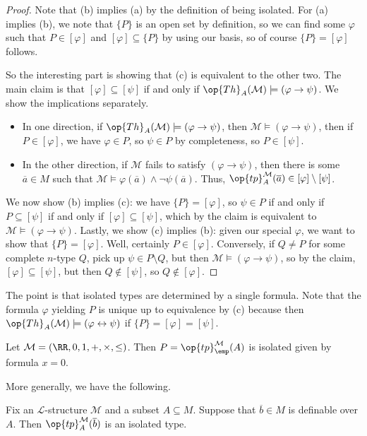 \documentclass[../notes.tex]{subfiles}
\begin{document}
\begin{proof}
	Note that (b) implies (a) by the definition of being isolated. For (a) implies (b), we note that $\{P\}$ is an open set by definition, so we can find some $\varphi$ such that $P\in[\varphi]$ and $[\varphi]\subseteq\{P\}$ by using our basis, so of course $\{P\}=[\varphi]$ follows.

	So the interesting part is showing that (c) is equivalent to the other two. The main claim is that $[\varphi]\subseteq[\psi]$ if and only if $\op{Th}_A(\mathcal M)\models(\varphi\to\psi)$. We show the implications separately.
	\begin{itemize}
		\item In one direction, if $\op{Th}_A(\mathcal M)\models(\varphi\to\psi)$, then $\mathcal M\models(\varphi\to\psi)$, then if $P\in[\varphi]$, we have $\varphi\in P$, so $\psi\in P$ by completeness, so $P\in[\psi]$.
		\item In the other direction, if $\mathcal M$ fails to satisfy $(\varphi\to\psi)$, then there is some $\overline a\in M$ such that $\mathcal M\models\varphi(\overline a)\land\lnot\psi(\overline a)$. Thus, $\op{tp}_A^{\mathcal M}(\overline a)\in[\varphi]\setminus[\psi]$.
	\end{itemize}
	We now show (b) implies (c): we have $\{P\}=[\varphi]$, so $\psi\in P$ if and only if $P\subseteq[\psi]$ if and only if $[\varphi]\subseteq[\psi]$, which by the claim is equivalent to $\mathcal M\models(\varphi\to\psi)$. Lastly, we show (c) implies (b): given our special $\varphi$, we want to show that $\{P\}=[\varphi]$. Well, certainly $P\in[\varphi]$. Conversely, if $Q\ne P$ for some complete $n$-type $Q$, pick up $\psi\in P\setminus Q$, but then $\mathcal M\models(\varphi\to\psi)$, so by the claim, $[\varphi]\subseteq[\psi]$, but then $Q\notin[\psi]$, so $Q\notin[\varphi]$.
\end{proof}
\begin{remark}
	The point is that isolated types are determined by a single formula. Note that the formula $\varphi$ yielding $P$ is unique up to equivalence by (c) because then $\op{Th}_A(\mathcal M)\models(\varphi\leftrightarrow\psi)$ if $\{P\}=[\varphi]=[\psi]$.
\end{remark}
\begin{example}
	Let $\mathcal M=(\RR,0,1,+,\times,\le)$. Then $P=\op{tp}_\emp^{\mathcal M}(A)$ is isolated given by formula $x=0$.
\end{example}
More generally, we have the following.
\begin{proposition}
	Fix an $\mathcal L$-structure $\mathcal M$ and a subset $A\subseteq M$. Suppose that $\overline b\in M$ is definable over $A$. Then $\op{tp}_A^{\mathcal M}(\overline b)$ is an isolated type.
\end{proposition}
\end{document}
